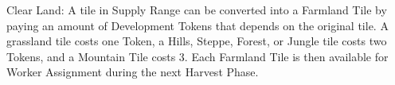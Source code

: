 Clear Land: A tile in Supply Range can be converted into a Farmland Tile by paying an amount of Development Tokens that depends on the original tile. A grassland tile costs one Token, a Hills, Steppe, Forest, or Jungle tile costs two Tokens, and a Mountain Tile costs 3. Each Farmland Tile is then available for Worker Assignment during the next Harvest Phase.

